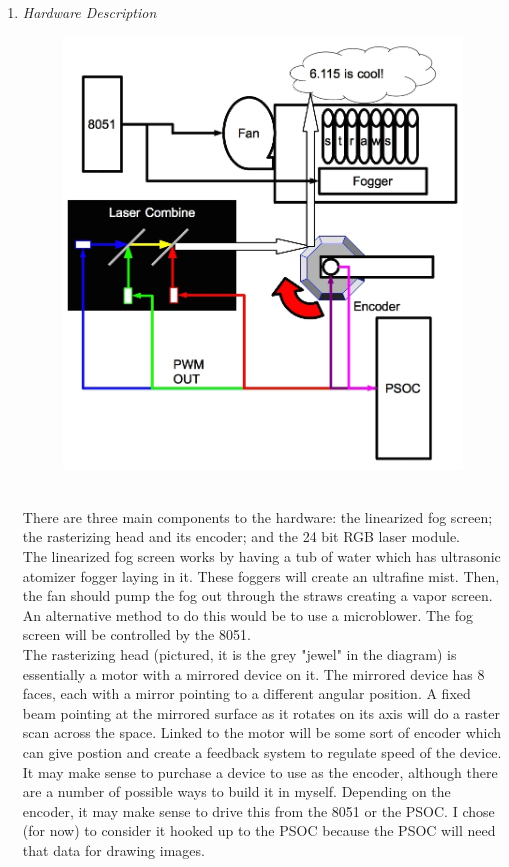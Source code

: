 \documentclass[12pt]{article}
\begin{document}
\begin{enumerate}
\item
\emph{Hardware Description}
\begin{figure}[ht]
\centering
\includegraphics[width=.7\textwidth]{hardware.jpg}
\end{figure}\\
There are three main components to the hardware: the linearized fog screen; the 
rasterizing head and its encoder; and the 24 bit RGB laser module.\\
The linearized fog screen works by having a tub of water which has
ultrasonic atomizer fogger laying in it. These foggers will create an
ultrafine mist. Then, the fan should pump the fog out through the straws creating a vapor screen. An alternative method to do this would be to 
use a microblower. The fog screen will be controlled by the 8051.\\
The rasterizing head (pictured, it is the grey "jewel" in the diagram)
is essentially a motor with a mirrored device
on it. The mirrored device has 8 faces, each with a mirror pointing
to a different angular position. A fixed beam pointing at the mirrored
surface as it rotates on its axis will do a raster scan across the space.
Linked to the motor will be some sort of encoder which can give postion
and create a feedback system to regulate speed of the device. 
It may make sense to purchase a device to use as the encoder,
although there are a number of possible ways to build it in myself.
Depending on the encoder, it may make sense to drive this from the 8051 or the PSOC.
I chose (for now) to consider it hooked up to the PSOC because the PSOC will need that data for drawing images.

\end{enumerate}
\end{document}
